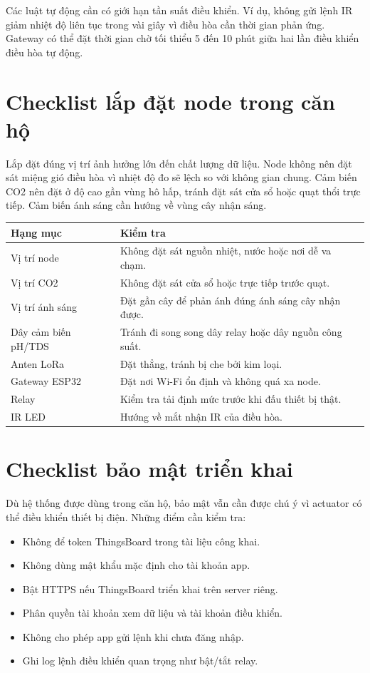 Các luật tự động cần có giới hạn tần suất điều khiển. Ví dụ, không gửi lệnh IR giảm nhiệt độ liên tục trong vài giây vì điều hòa cần thời gian phản ứng. Gateway có thể đặt thời gian chờ tối thiểu 5 đến 10 phút giữa hai lần điều khiển điều hòa tự động.

\section{Checklist lắp đặt node trong căn hộ}
Lắp đặt đúng vị trí ảnh hưởng lớn đến chất lượng dữ liệu. Node không nên đặt sát miệng gió điều hòa vì nhiệt độ đo sẽ lệch so với không gian chung. Cảm biến CO2 nên đặt ở độ cao gần vùng hô hấp, tránh đặt sát cửa sổ hoặc quạt thổi trực tiếp. Cảm biến ánh sáng cần hướng về vùng cây nhận sáng.

\begin{longtable}{|p{4cm}|p{8.5cm}|}
\hline
\textbf{Hạng mục} & \textbf{Kiểm tra} \\
\hline
Vị trí node & Không đặt sát nguồn nhiệt, nước hoặc nơi dễ va chạm. \\
\hline
Vị trí CO2 & Không đặt sát cửa sổ hoặc trực tiếp trước quạt. \\
\hline
Vị trí ánh sáng & Đặt gần cây để phản ánh đúng ánh sáng cây nhận được. \\
\hline
Dây cảm biến pH/TDS & Tránh đi song song dây relay hoặc dây nguồn công suất. \\
\hline
Anten LoRa & Đặt thẳng, tránh bị che bởi kim loại. \\
\hline
Gateway ESP32 & Đặt nơi Wi-Fi ổn định và không quá xa node. \\
\hline
Relay & Kiểm tra tải định mức trước khi đấu thiết bị thật. \\
\hline
IR LED & Hướng về mắt nhận IR của điều hòa. \\
\hline
\end{longtable}

\section{Checklist bảo mật triển khai}
Dù hệ thống được dùng trong căn hộ, bảo mật vẫn cần được chú ý vì actuator có thể điều khiển thiết bị điện. Những điểm cần kiểm tra:
\begin{itemize}
    \item Không để token ThingsBoard trong tài liệu công khai.
    \item Không dùng mật khẩu mặc định cho tài khoản app.
    \item Bật HTTPS nếu ThingsBoard triển khai trên server riêng.
    \item Phân quyền tài khoản xem dữ liệu và tài khoản điều khiển.
    \item Không cho phép app gửi lệnh khi chưa đăng nhập.
    \item Ghi log lệnh điều khiển quan trọng như bật/tắt relay.
\end{itemize}

